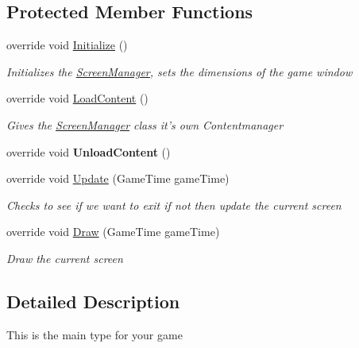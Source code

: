 \subsection*{Protected Member Functions}
\begin{DoxyCompactItemize}
\item 
override void \hyperlink{class_pacman_1_1_game1_a55a2bc52a62f5813f20860d10d7614f5}{Initialize} ()
\begin{DoxyCompactList}\small\item\em Initializes the \hyperlink{class_pacman_1_1_screen_manager}{Screen\-Manager}, sets the dimensions of the game window \end{DoxyCompactList}\item 
override void \hyperlink{class_pacman_1_1_game1_a9c5fd4623bf1d9d6b1ea2cb37e5f2b3a}{Load\-Content} ()
\begin{DoxyCompactList}\small\item\em Gives the \hyperlink{class_pacman_1_1_screen_manager}{Screen\-Manager} class it's own Contentmanager \end{DoxyCompactList}\item 
\hypertarget{class_pacman_1_1_game1_a5742bbddb5003b69c5068dd9ea632a78}{override void {\bfseries Unload\-Content} ()}\label{class_pacman_1_1_game1_a5742bbddb5003b69c5068dd9ea632a78}

\item 
override void \hyperlink{class_pacman_1_1_game1_a8d7c660a92475d021af8e2da33f0af1b}{Update} (Game\-Time game\-Time)
\begin{DoxyCompactList}\small\item\em Checks to see if we want to exit if not then update the current screen \end{DoxyCompactList}\item 
override void \hyperlink{class_pacman_1_1_game1_aa296bdd57b2e540aebc8ab81c9f166a4}{Draw} (Game\-Time game\-Time)
\begin{DoxyCompactList}\small\item\em Draw the current screen \end{DoxyCompactList}\end{DoxyCompactItemize}


\subsection{Detailed Description}
This is the main type for your game 



